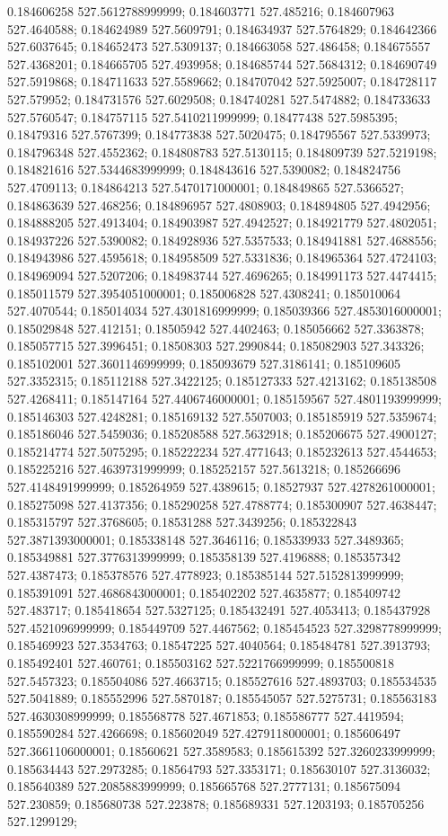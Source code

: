 0.184606258 527.5612788999999; 0.184603771 527.485216; 0.184607963 527.4640588; 0.184624989 527.5609791; 0.184634937 527.5764829; 0.184642366 527.6037645; 0.184652473 527.5309137; 0.184663058 527.486458; 0.184675557 527.4368201; 0.184665705 527.4939958; 0.184685744 527.5684312; 0.184690749 527.5919868; 0.184711633 527.5589662; 0.184707042 527.5925007; 0.184728117 527.579952; 0.184731576 527.6029508; 0.184740281 527.5474882; 0.184733633 527.5760547; 0.184757115 527.5410211999999; 0.18477438 527.5985395; 0.18479316 527.5767399; 0.184773838 527.5020475; 0.184795567 527.5339973; 0.184796348 527.4552362; 0.184808783 527.5130115; 0.184809739 527.5219198; 0.184821616 527.5344683999999; 0.184843616 527.5390082; 0.184824756 527.4709113; 0.184864213 527.5470171000001; 0.184849865 527.5366527; 0.184863639 527.468256; 0.184896957 527.4808903; 0.184894805 527.4942956; 0.184888205 527.4913404; 0.184903987 527.4942527; 0.184921779 527.4802051; 0.184937226 527.5390082; 0.184928936 527.5357533; 0.184941881 527.4688556; 0.184943986 527.4595618; 0.184958509 527.5331836; 0.184965364 527.4724103; 0.184969094 527.5207206; 0.184983744 527.4696265; 0.184991173 527.4474415; 0.185011579 527.3954051000001; 0.185006828 527.4308241; 0.185010064 527.4070544; 0.185014034 527.4301816999999; 0.185039366 527.4853016000001; 0.185029848 527.412151; 0.18505942 527.4402463; 0.185056662 527.3363878; 0.185057715 527.3996451; 0.18508303 527.2990844; 0.185082903 527.343326; 0.185102001 527.3601146999999; 0.185093679 527.3186141; 0.185109605 527.3352315; 0.185112188 527.3422125; 0.185127333 527.4213162; 0.185138508 527.4268411; 0.185147164 527.4406746000001; 0.185159567 527.4801193999999; 0.185146303 527.4248281; 0.185169132 527.5507003; 0.185185919 527.5359674; 0.185186046 527.5459036; 0.185208588 527.5632918; 0.185206675 527.4900127; 0.185214774 527.5075295; 0.185222234 527.4771643; 0.185232613 527.4544653; 0.185225216 527.4639731999999; 0.185252157 527.5613218; 0.185266696 527.4148491999999; 0.185264959 527.4389615; 0.18527937 527.4278261000001; 0.185275098 527.4137356; 0.185290258 527.4788774; 0.185300907 527.4638447; 0.185315797 527.3768605; 0.18531288 527.3439256; 0.185322843 527.3871393000001; 0.185338148 527.3646116; 0.185339933 527.3489365; 0.185349881 527.3776313999999; 0.185358139 527.4196888; 0.185357342 527.4387473; 0.185378576 527.4778923; 0.185385144 527.5152813999999; 0.185391091 527.4686843000001; 0.185402202 527.4635877; 0.185409742 527.483717; 0.185418654 527.5327125; 0.185432491 527.4053413; 0.185437928 527.4521096999999; 0.185449709 527.4467562; 0.185454523 527.3298778999999; 0.185469923 527.3534763; 0.18547225 527.4040564; 0.185484781 527.3913793; 0.185492401 527.460761; 0.185503162 527.5221766999999; 0.185500818 527.5457323; 0.185504086 527.4663715; 0.185527616 527.4893703; 0.185534535 527.5041889; 0.185552996 527.5870187; 0.185545057 527.5275731; 0.185563183 527.4630308999999; 0.185568778 527.4671853; 0.185586777 527.4419594; 0.185590284 527.4266698; 0.185602049 527.4279118000001; 0.185606497 527.3661106000001; 0.18560621 527.3589583; 0.185615392 527.3260233999999; 0.185634443 527.2973285; 0.18564793 527.3353171; 0.185630107 527.3136032; 0.185640389 527.2085883999999; 0.185665768 527.2777131; 0.185675094 527.230859; 0.185680738 527.223878; 0.185689331 527.1203193; 0.185705256 527.1299129; 